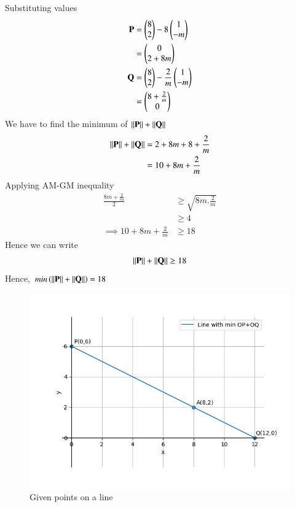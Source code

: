 \documentclass[journal]{IEEEtran}
\begin{document}
Substituting values
\begin{align}
    \mathbf{P} &= \begin{pmatrix}8 \\ 2\end{pmatrix} - 8\begin{pmatrix}1 \\ -m\end{pmatrix} \\
            &= \begin{pmatrix}0 \\ 2+8m\end{pmatrix} \\
    \mathbf{Q} &= \begin{pmatrix}8 \\ 2\end{pmatrix} - \frac{2}{m}\begin{pmatrix}1 \\ -m\end{pmatrix} \\
            &= \begin{pmatrix}8 + \frac{2}{m} \\ 0\end{pmatrix}
\end{align}
We have to find the minimum of $\left\lVert\mathbf{P}\right\rVert + \left\lVert\mathbf{Q}\right\rVert$
\begin{align}
    \left\lVert\mathbf{P}\right\rVert + \left\lVert\mathbf{Q}\right\rVert &= 2 + 8m + 8 + \frac{2}{m} \\
    &= 10 + 8m + \frac{2}{m}
\end{align}
Applying AM-GM inequality
\begin{align}
    \frac{8m + \frac{2}{m}}{2} &\geq \sqrt{8m .\frac{2}{m}} \\
    &\geq 4\\
    \implies 10 + 8m + \frac{2}{m} &\geq 18
\end{align}
Hence we can write
\begin{align}
    \left\lVert\mathbf{P}\right\rVert + \left\lVert\mathbf{Q}\right\rVert \geq 18
\end{align}
Hence, $min\left(\left\lVert\mathbf{P}\right\rVert + \left\lVert\mathbf{Q}\right\rVert\right) = 18$

\begin{figure}[H]
   \centering
  \includegraphics[width=0.64\columnwidth]{figs/fig.png}
   \caption{Given points on a line}
   \label{stemplot}
\end{figure}
\end{document}
